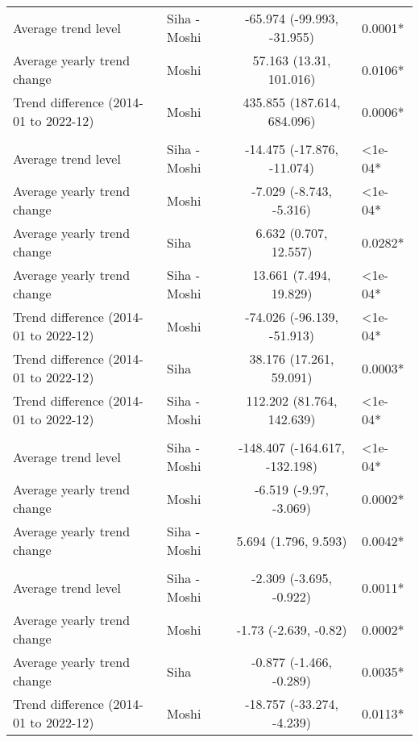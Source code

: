 \begin{longtable}{l|lcl}
\midrule\addlinespace[2.5pt]
\multicolumn{4}{l}{Pneumonia, Severe} \\[2.5pt] 
\midrule\addlinespace[2.5pt]
Average trend level & Siha - Moshi & -65.974 (-99.993, -31.955) & 0.0001* \\ 
Average yearly trend change & Moshi & 57.163 (13.31, 101.016) & 0.0106* \\ 
Trend difference (2014-01 to 2022-12) & Moshi & 435.855 (187.614, 684.096) & 0.0006* \\ 
\midrule\addlinespace[2.5pt]
\multicolumn{4}{l}{Poisoning} \\[2.5pt] 
\midrule\addlinespace[2.5pt]
Average trend level & Siha - Moshi & -14.475 (-17.876, -11.074) & <1e-04* \\ 
Average yearly trend change & Moshi & -7.029 (-8.743, -5.316) & <1e-04* \\ 
Average yearly trend change & Siha & 6.632 (0.707, 12.557) & 0.0282* \\ 
Average yearly trend change & Siha - Moshi & 13.661 (7.494, 19.829) & <1e-04* \\ 
Trend difference (2014-01 to 2022-12) & Moshi & -74.026 (-96.139, -51.913) & <1e-04* \\ 
Trend difference (2014-01 to 2022-12) & Siha & 38.176 (17.261, 59.091) & 0.0003* \\ 
Trend difference (2014-01 to 2022-12) & Siha - Moshi & 112.202 (81.764, 142.639) & <1e-04* \\ 
\midrule\addlinespace[2.5pt]
\multicolumn{4}{l}{Psychoses} \\[2.5pt] 
\midrule\addlinespace[2.5pt]
Average trend level & Siha - Moshi & -148.407 (-164.617, -132.198) & <1e-04* \\ 
Average yearly trend change & Moshi & -6.519 (-9.97, -3.069) & 0.0002* \\ 
Average yearly trend change & Siha - Moshi & 5.694 (1.796, 9.593) & 0.0042* \\ 
\midrule\addlinespace[2.5pt]
\multicolumn{4}{l}{Schistosomiasis} \\[2.5pt] 
\midrule\addlinespace[2.5pt]
Average trend level & Siha - Moshi & -2.309 (-3.695, -0.922) & 0.0011* \\ 
Average yearly trend change & Moshi & -1.73 (-2.639, -0.82) & 0.0002* \\ 
Average yearly trend change & Siha & -0.877 (-1.466, -0.289) & 0.0035* \\ 
Trend difference (2014-01 to 2022-12) & Moshi & -18.757 (-33.274, -4.239) & 0.0113* \\ 

\end{longtable}
